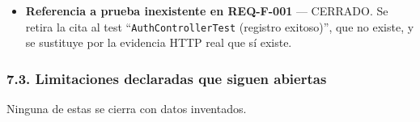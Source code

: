 \documentclass[
  spanish,
]{article}
\begin{document}
\begin{itemize}
  \textbf{Correspondencia exacta SRS ↔ matriz} --- CERRADO. Una versión
  intermedia de esta revisión había descompuesto \texttt{REQ-\allowbreak{}F-\allowbreak{}013},
  \texttt{REQ-\allowbreak{}F-\allowbreak{}015} y \texttt{REQ-\allowbreak{}NF-\allowbreak{}012} en subrequisitos con sufijo
  de letra, lo que dejaba al SRS con identificadores que la matriz no
  contenía. Se revirtió: los tres conservan un identificador único y
  separan sus obligaciones dentro del bloque, de modo que ambos
  documentos declaran exactamente los mismos 44 identificadores.
\item
  \textbf{Referencia a prueba inexistente en REQ-F-001} --- CERRADO. Se
  retira la cita al test ``\texttt{Auth\allowbreak{}Controller\allowbreak{}Test} (registro
  exitoso)'', que no existe, y se sustituye por la evidencia HTTP real
  que sí existe.
\end{itemize}

\subsubsection{7.3. Limitaciones declaradas que siguen
abiertas}\label{limitaciones-declaradas-que-siguen-abiertas}

Ninguna de estas se cierra con datos inventados.
\end{document}
